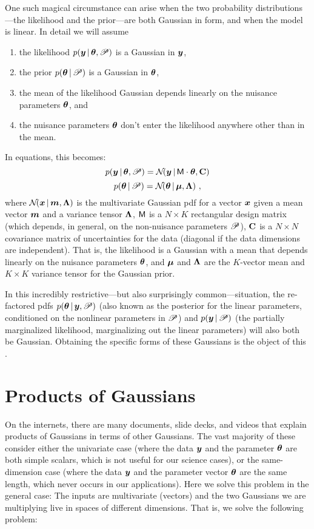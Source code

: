 One such magical circumstance can arise when the two probability
distributions---the likelihood and the prior---are both Gaussian in
form, and when the model is linear.
In detail we will assume
\begin{enumerate}
\item
the likelihood $p(\boldsymbol{y}\,|\,\boldsymbol{\theta},\mathscr{P})$ is a Gaussian in $\boldsymbol{y}$,
\item
the prior $p(\boldsymbol{\theta}\,|\,\mathscr{P})$ is a Gaussian in $\boldsymbol{\theta}$,
\item
the mean of the likelihood Gaussian depends linearly on the nuisance
parameters $\boldsymbol{\theta}$, and
\item
the nuisance parameters $\boldsymbol{\theta}$ don't enter the likelihood anywhere
other than in the mean.
\end{enumerate}
In equations, this becomes:
\begin{equation}
p(\boldsymbol{y}\,|\,\boldsymbol{\theta},\mathscr{P}) = \mathcal{N}\!(\boldsymbol{y}\,|\,\mathsf{M}\cdot\boldsymbol{\theta},\mathbf{C})
\end{equation}
\begin{equation}
p(\boldsymbol{\theta}\,|\,\mathscr{P}) = \mathcal{N}\!(\boldsymbol{\theta}\,|\,\boldsymbol{\mu},\mathbf{\Lambda})
~ ,
\end{equation}
where
$\mathcal{N}\!(\boldsymbol{x}\,|\,\boldsymbol{m},\mathbf{\Lambda})$ is the multivariate Gaussian pdf for a vector $\boldsymbol{x}$
given a mean vector $\boldsymbol{m}$ and a variance tensor $\mathbf{\Lambda}$,
$\mathsf{M}$ is a $N\times K$ rectangular design matrix (which depends, in
general, on the non-nuisance parameters $\mathscr{P}$),
$\mathbf{C}$ is a $N\times N$ covariance matrix of uncertainties for the
data (diagonal if the data dimensions are independent).
That is, the likelihood is a Gaussian with a mean that depends
linearly on the nuisance parameters $\boldsymbol{\theta}$, and
$\boldsymbol{\mu}$ and $\mathbf{\Lambda}$ are the $K$-vector mean and $K\times K$ variance tensor
for the Gaussian prior.

In this incredibly restrictive---but also surprisingly
common---situation, the re-factored pdfs $p(\boldsymbol{\theta}\,|\,\boldsymbol{y},\mathscr{P})$
(also known as the posterior for the linear parameters, conditioned on
the nonlinear parameters in $\mathscr{P}$) and $p(\boldsymbol{y}\,|\,\mathscr{P})$ (the
partially marginalized likelihood, marginalizing out the linear
parameters) will also both be Gaussian.
Obtaining the specific forms of these Gaussians is the object of this
\documentname.

\section{Products of Gaussians}\label{sec:problemsolution}

On the internets, there are many documents, slide decks, and videos
that explain products of Gaussians in terms of other Gaussians.
The vast majority of these consider either the univariate case (where
the data $\boldsymbol{y}$ and the parameter $\boldsymbol{\theta}$ are both simple scalars, which
is not useful for our science cases), or the same-dimension case (where the data
$\boldsymbol{y}$ and the parameter vector $\boldsymbol{\theta}$ are the same length, which never
occurs in our applications).
Here we solve this problem in the general case:
The inputs are multivariate (vectors) and the two Gaussians we are
multiplying live in spaces of different dimensions.
That is, we solve the following problem:


